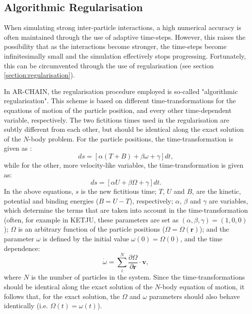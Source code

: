 \documentclass[english, twoside]{HYgradu}
\begin{document}
\subsection{Algorithmic Regularisation}

When simulating strong inter-particle interactions, a high numerical accuracy is often maintained through the use of adaptive time-steps. However, this raises the possibility that as the interactions become stronger, the time-steps become infinitesimally small and the simulation effectively stops progressing. Fortunately, this can be circumvented through the use of regularisation (see section \ref{section:regularisation}). 

In AR-CHAIN, the regularisation procedure employed is so-called "algorithmic regularisation". This scheme is based on different time-transformations for the equations of motion of the particle position, and every other time-dependent variable, respectively. The two fictitious times used in the regularisation are subtly different from each other, but should be identical along the exact solution of the $N$-body problem. For the particle positions, the time-transformation is given as \citep{Mikkola2008ARCHAIN}:
\begin{equation}
ds = [ \alpha ( T+B ) + \beta \omega + \gamma ] dt, \label{eq:ds_coords}
\end{equation}
while for the other, more velocity-like variables, the time-transformation is given as:
\begin{equation}
ds = [\alpha U + \beta \Omega + \gamma] dt. \label{eq:ds_vels}
\end{equation}
In the above equations, $s$ is the new fictitious time; $T$, $U$ and $B$, are the kinetic, potential and binding energies ($B = U - T$), respectively; $\alpha$, $\beta$ and $\gamma$ are variables, which determine the terms that are taken into account in the time-transformation (often, for example in KETJU, these parameters are set as $(\alpha, \beta, \gamma) = (1, 0, 0)$); $\Omega$ is an arbitrary function of the particle positions ($\Omega = \Omega(\mathbf{r})$); and the parameter $\omega$ is defined by the initial value $\omega(0) = \Omega(0)$, and the time dependence:
\begin{equation}
\dot{\omega} = \displaystyle\sum^N_i \frac{\partial \Omega}{\partial \mathbf{r}} \cdot \mathbf{v},
\end{equation}
where $N$ is the number of particles in the system. Since the time-transformations should be identical along the exact solution of the $N$-body equation of motion, it follows that, for the exact solution, the $\Omega$ and $\omega$ parameters should also behave identically (i.e. $\Omega(t) = \omega(t)$). 
\end{document}
